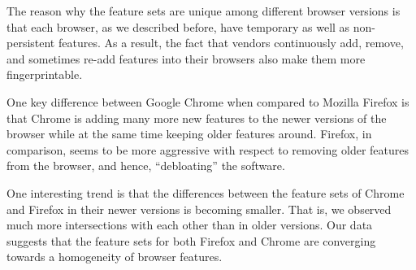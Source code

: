 The reason why the feature sets are unique among different browser
versions is that each browser, as we described before, have temporary
as well as non-persistent features. As a result, the fact that vendors
continuously add, remove, and sometimes re-add features into their
browsers also make them more fingerprintable.

One key difference between Google Chrome when compared to Mozilla
Firefox is that Chrome is adding many more new features to the newer
versions of the browser while at the same time keeping older features
around. Firefox, in comparison, seems to be more aggressive with
respect to removing older features from the browser, and hence,
``debloating'' the software.

One interesting trend is that the differences between the feature sets
of Chrome and Firefox in their newer versions is becoming smaller.
That is, we observed much more intersections with each other than in
older versions. Our data suggests that the feature sets for both
Firefox and Chrome are converging towards a homogeneity of browser
features.
